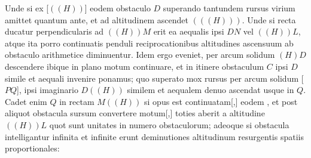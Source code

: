 Unde si ex [$\displaystyle ((H))$]  eodem obstaculo $\displaystyle D$ superando tantundem rursus virium amittet quantum ante, et ad altitudinem ascendet $\displaystyle (((H)))$. Unde si recta ducatur  perpendicularis ad $\displaystyle ((H))M$ erit ea aequalis ipsi $\displaystyle DN$ vel $\displaystyle ((H))L$, atque ita porro continuatis penduli\protect{} reciprocationibus altitudines ascensuum ab obstaculo arithmetice diminuentur. Idem ergo eveniet,  per arcum solidum $\displaystyle (H)D$ descendere ibique in plano motum continuare, et in itinere obstaculum $\displaystyle C$ ipsi $\displaystyle D$ simile et aequali invenire ponamus; quo superato mox rursus per arcum solidum [$\displaystyle PQ$], ipsi imaginario $\displaystyle D((H))$ similem  et aequalem denuo ascendat usque in $\displaystyle Q$. Cadet enim $\displaystyle Q$ in rectam $\displaystyle M((H))$ si opus est continuatam[,] eodem , et post aliquot obstacula  sursum convertere motum[,] toties aberit a  altitudine $\displaystyle ((H))L$ quot sunt unitates in numero obstaculorum; adeoque si obstacula intelligantur infinita et infinite 
erunt deminutiones altitudinum resurgentis spatiis proportionales:

